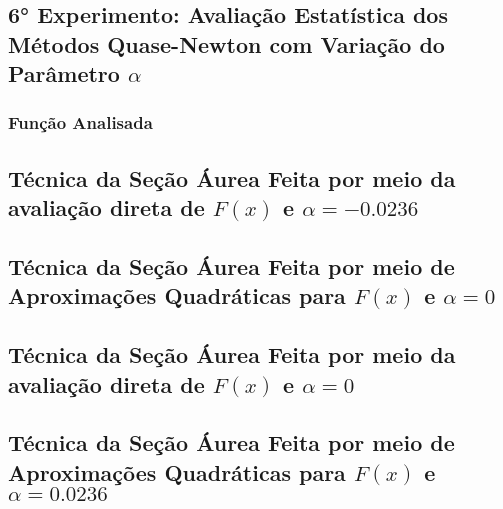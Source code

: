 \subsection{6° Experimento: Avaliação Estatística dos Métodos Quase-Newton com Variação do Parâmetro $\alpha$}
    \subsubsection{Função Analisada}

    \subsection{Técnica da Seção Áurea Feita por meio da avaliação direta de $F(x)$ e $\alpha=-0.0236$}
        
    \subsection{Técnica da Seção Áurea Feita por meio de Aproximações Quadráticas para $F(x)$ e $\alpha=0$}   
        
    \subsection{Técnica da Seção Áurea Feita por meio da avaliação direta de $F(x)$ e $\alpha=0$}
        
    \subsection{Técnica da Seção Áurea Feita por meio de Aproximações Quadráticas para $F(x)$ e $\alpha=0.0236$}
        
\newpage